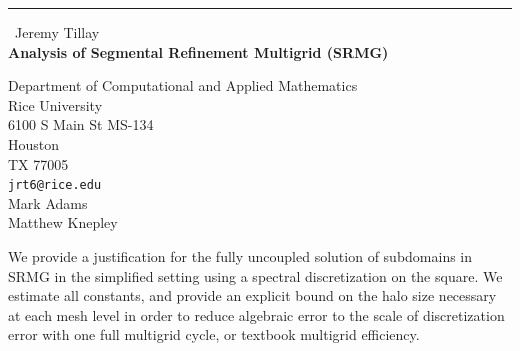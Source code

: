 \documentclass{report}
\begin{document}
\begin{center}
\rule{6in}{1pt} \
{\large Jeremy Tillay \\
{\bf Analysis of Segmental Refinement Multigrid (SRMG)}}

Department of Computational and Applied Mathematics \\ Rice University \\ 6100 S Main St MS-134 \\ Houston \\ TX 77005
\\
{\tt jrt6@rice.edu}\\
Mark Adams\\
Matthew Knepley\end{center}

We provide a justification for the fully uncoupled solution of subdomains
in SRMG in the simplified setting using a spectral discretization on the
square. We estimate all constants, and provide an explicit bound on the
halo size necessary at each mesh level in order to reduce algebraic error
to the scale of discretization error with one full multigrid cycle, or
textbook multigrid efficiency.
\end{document}
